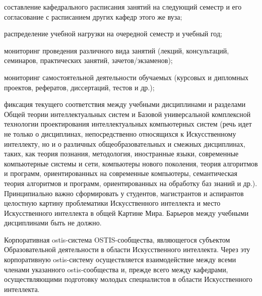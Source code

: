\begin{SCn}
{\begin{scnitemize}
    \begin{scnitemizeii}
        \item составление кафедрального расписания занятий на следующий семестр и его согласование с расписанием других кафедр этого же вуза;
        \item распределение учебной нагрузки на очередной семестр и учебный год;
        \item мониторинг проведения различного вида занятий (лекций, консультаций, семинаров, практических занятий, зачетов/экзаменов);
        \item мониторинг самостоятельной деятельности обучаемых (курсовых и дипломных проектов, рефератов, диссертаций, тестов и др.);
        \item фиксация текущего соответствия между учебными дисциплинами и разделами Общей теории интеллектуальных систем и Базовой универсальной комплексной технологии проектирования интеллектуальных компьютерных систем (речь идет не только о дисциплинах, непосредственно относящихся к Искусственному интеллекту, но и о различных общеобразовательных и смежных дисциплинах, таких, как теория познания, методология, иностранные языки, современные компьютерные системы и сети, компьютеры нового поколения, теория алгоритмов и программ, ориентированных на современные компьютеры, семантическая теория алгоритмов и программ, ориентированных на обработку баз знаний и др.). Принципиально важно сформировать у студентов, магистрантов и аспирантов целостную картину проблематики Искусственного интеллекта и место Искусственного интеллекта в общей Картине Мира. Барьеров между учебными дисциплинами быть не должно.
    \end{scnitemizeii}
    \item Корпоративная ostis-система OSTIS-сообщества, являющегося субъектом Образовательной деятельности в области Искусственного интеллекта. Через эту корпоративную ostis-систему осуществляется взаимодействие между всеми членами указанного ostis-сообщества и, прежде всего между кафедрами, осуществляющими подготовку молодых специалистов в области Искусственного интеллекта.
\end{scnitemize}}


\end{SCn}
